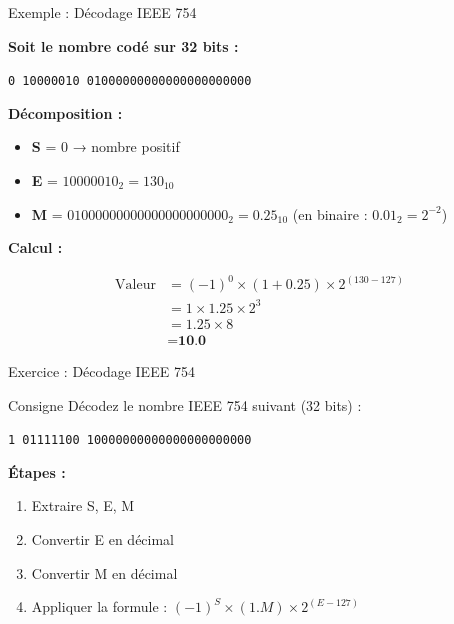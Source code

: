 \documentclass[aspectratio=1610]{beamer}
\begin{document}
\begin{frame}{Exemple : Décodage IEEE 754}

  \textbf{Soit le nombre codé sur 32 bits :}

  \begin{center}
    \texttt{0 10000010 01000000000000000000000}
  \end{center}

  \vspace{0.3cm}

  \textbf{Décomposition :}

  \begin{itemize}
    \item \textbf{S} = 0 → nombre positif
    \item \textbf{E} = $10000010_2 = 130_{10}$
    \item \textbf{M} = $01000000000000000000000_2 = 0.25_{10}$ (en binaire : $0.01_2 = 2^{-2}$)
  \end{itemize}

  \vspace{0.3cm}

  \textbf{Calcul :}
  
  \vspace{-2em}
  \begin{align*}
    \text{Valeur} &= (-1)^0 \times (1 + 0.25) \times 2^{(130 - 127)} \\
                  &= 1 \times 1.25 \times 2^3 \\
                  &= 1.25 \times 8 \\
                  &= \textbf{10.0}
  \end{align*}

\end{frame}

\begin{frame}{Exercice : Décodage IEEE 754}

  \begin{exampleblock}{Consigne}
    Décodez le nombre IEEE 754 suivant (32 bits) :

    \begin{center}
      \texttt{1 01111100 10000000000000000000000}
    \end{center}
  \end{exampleblock}

  \vspace{0.5cm}

  \textbf{Étapes :}

  \begin{enumerate}
    \item Extraire S, E, M
    \item Convertir E en décimal
    \item Convertir M en décimal
    \item Appliquer la formule : $(-1)^S \times (1.M) \times 2^{(E-127)}$
  \end{enumerate}



\end{frame}
\end{document}
